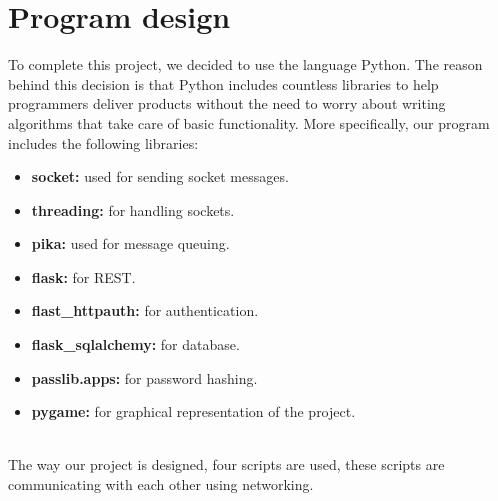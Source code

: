 \documentclass[a4paper]{article}
\begin{document}
\section*{Program design}
To complete this project, we decided to use the language Python. The reason behind this decision is that Python includes countless libraries to help programmers deliver products without the need to worry about writing algorithms that take care of basic functionality. More specifically, our program includes the following libraries:
\begin{itemize}
	\item \textbf{socket:} used for sending socket messages.
	\item \textbf{threading:} for handling sockets.
	\item \textbf{pika:} used for message queuing.
	\item \textbf{flask:} for REST.
	\item \textbf{flast\_httpauth:} for authentication.
	\item \textbf{flask\_sqlalchemy:} for database.
	\item \textbf{passlib.apps:} for password hashing.
	\item \textbf{pygame:} for graphical representation of the project.
\end{itemize}
\\The way our project is designed, four scripts are used, these scripts are communicating with each other using networking. 
\end{document}
